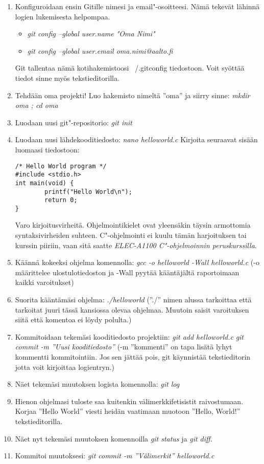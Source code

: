 \documentclass[12pt,portrait,a4]{article}
\begin{document}
\begin{enumerate}
\item Konfiguroidaan ensin Gitille nimesi ja email"-osoitteesi.  Nämä tekevät
lähinnä logien lukemisesta helpompaa.
\begin{itemize}
\item \emph{git config --global user.name "Oma Nimi"}
\item \emph{git config --global user.email oma.nimi@aalto.fi}
\end{itemize}
Git tallentaa nämä kotihakemistoosi ~/.gitconfig tiedostoon.  Voit syöttää
tiedot sinne myös tekstieditorilla.

\item Tehdään oma projekti!  Luo hakemisto nimeltä ''oma'' ja siirry sinne:
\emph{mkdir oma ; cd oma}
\item Luodaan uusi git"-repositorio: \emph{git init}
\item Luodaan uusi lähdekooditiedosto: \emph{nano helloworld.c}
Kirjoita seuraavat sisään luomaasi tiedostoon:
\begin{verbatim}
/* Hello World program */
#include <stdio.h>
int main(void) {
        printf("Hello World\n");
        return 0;
}
\end{verbatim}
Varo kirjoitusvirheitä.  Ohjelmointikielet ovat yleensäkin täysin armottomia
syntaksivirheiden suhteen.  C"-ohjelmointi ei kuulu tämän harjoituksen tai
kurssin piiriin, vaan sitä saatte \emph{ELEC-A1100 C"-ohjelmoinnin
peruskurssilla}.

\item Käännä kokeeksi ohjelma komennolla: \emph{gcc -o helloworld -Wall helloworld.c}
(-o määrittelee ulostulotiedoston ja -Wall pyytää kääntäjältä raportoimaan
kaikki varoitukset)
\item Suorita kääntämäsi ohjelma: \emph{./helloworld}
(''./'' nimen alussa tarkoittaa että tarkoitat juuri tässä kansiossa olevaa
ohjelmaa.  Muutoin saisit varoituksen siitä että komentoa ei löydy polulta.)

\item Kommitoidaan tekemäsi kooditiedosto projektiin: \emph{git add
helloworld.c}
\emph{git commit -m ''Uusi kooditiedosto''}
(-m ''kommenti'' on tapa lisätä lyhyt kommentti kommitointiin.  Jos sen jättää
pois, git käynnistää tekstieditorin jotta voit kirjoittaa logientryn.)

\item Näet tekemäsi muutoksen logista komennolla: \emph{git log}

\item Hienon ohjelmasi tuloste saa kuitenkin välimerkkifetisistit
raivostumaan.  Korjaa ''Hello World'' viesti heidän vaatimaan muotoon
''Hello, World!'' tekstieditorilla.
\item Näet nyt tekemäsi muutoksen komennoilla \emph{git status} ja \emph{git diff}.
\item Kommitoi muutoksesi: \emph{git commit -m ''Välimerkit'' helloworld.c}


\end{enumerate}
\end{document}
